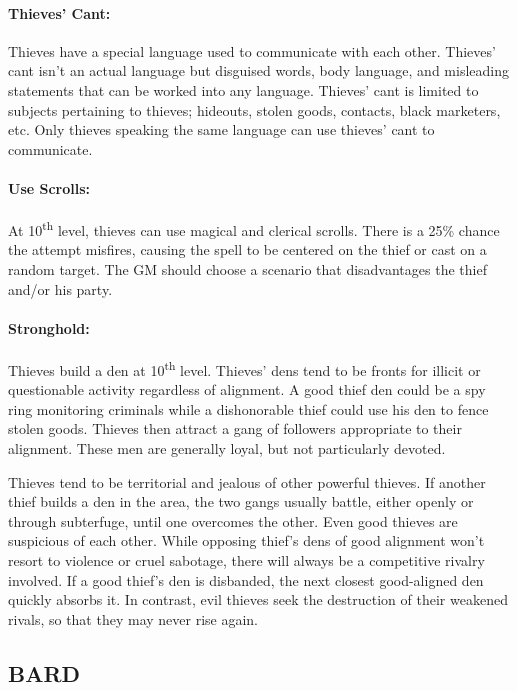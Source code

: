\begin{multicols}{2}
\paragraph{Thieves' Cant:} Thieves have a special language used to communicate with each other.  Thieves' cant isn't an actual language but disguised words, body language, and misleading statements that can be worked into any language.  Thieves' cant is limited to subjects pertaining to thieves; hideouts, stolen goods, contacts, black marketers, etc.  Only thieves speaking the same language can use thieves' cant to communicate.  

\paragraph{Use Scrolls:} At 10\textsuperscript{th} level, thieves can use magical and clerical scrolls.  There is a 25\% chance the attempt misfires, causing the spell to be centered on the thief or cast on a random target.  The GM should choose a scenario that disadvantages the thief and/or his party.

\paragraph{Stronghold:} Thieves build a den at 10\textsuperscript{th} level.  Thieves' dens tend to be fronts for illicit or questionable activity regardless of alignment.  A good thief den could be a spy ring monitoring criminals while a dishonorable thief could use his den to fence stolen goods. Thieves then attract a gang of followers appropriate to their alignment.  These men are generally loyal, but not particularly devoted.  

Thieves tend to be territorial and jealous of other powerful thieves.  If another thief builds a den in the area, the two gangs usually battle, either openly or through subterfuge, until one overcomes the other.  Even good thieves are suspicious of each other.  While opposing thief's dens of good alignment won't resort to violence or cruel sabotage, there will always be a competitive rivalry involved.  If a good thief's den is disbanded, the next closest good-aligned den quickly absorbs it.  In contrast, evil thieves seek the destruction of their weakened rivals, so that they may never rise again.

\subsection{BARD}


\end{multicols}
